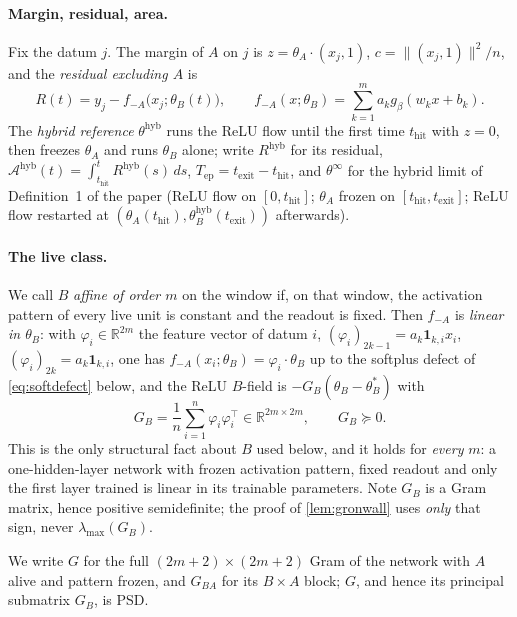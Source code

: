 \documentclass[11pt]{article}
\theoremstyle{definition}
\theoremstyle{remark}
\newcommand{\R}{\mathbb{R}}
\newcommand{\hyb}{\mathrm{hyb}}
\newcommand{\thit}{t_{\mathrm{hit}}}
\newcommand{\texit}{t_{\mathrm{exit}}}
\newcommand{\Ar}{\mathcal{A}}
\newcommand{\Tep}{T_{\mathrm{ep}}}
\begin{document}
\paragraph{Margin, residual, area.} Fix the datum $j$. The margin of $A$ on $j$
is $z=\theta_A\cdot(x_j,1)$, $c=\|(x_j,1)\|^2/n$, and the \emph{residual
excluding $A$} is
\begin{equation}\label{eq:residual}
R(t)=y_j-f_{-A}\bigl(x_j;\theta_B(t)\bigr),
\qquad
f_{-A}(x;\theta_B)=\sum_{k=1}^{m}a_k g_\beta(w_kx+b_k).
\end{equation}
The \emph{hybrid reference} $\theta^{\hyb}$ runs the ReLU flow until the first
time $\thit$ with $z=0$, then freezes $\theta_A$ and runs $\theta_B$ alone; write
$R^{\hyb}$ for its residual, $\Ar^{\hyb}(t)=\int_{\thit}^{t}R^{\hyb}(s)\,ds$,
$\Tep=\texit-\thit$, and $\theta^\infty$ for the hybrid limit of
Definition~1 of the paper (ReLU flow on $[0,\thit]$; $\theta_A$ frozen on
$[\thit,\texit]$; ReLU flow restarted at
$(\theta_A(\thit),\theta_B^{\hyb}(\texit))$ afterwards).

\paragraph{The live class.} We call $B$ \emph{affine of order $m$} on the window
if, on that window, the activation pattern of every live unit is constant and the
readout is fixed. Then $f_{-A}$ is \emph{linear in $\theta_B$}: with
$\varphi_i\in\R^{2m}$ the feature vector of datum $i$,
$(\varphi_i)_{2k-1}=a_k\mathbf 1_{k,i}x_i$, $(\varphi_i)_{2k}=a_k\mathbf
1_{k,i}$, one has $f_{-A}(x_i;\theta_B)=\varphi_i\cdot\theta_B$ up to the
softplus defect of \eqref{eq:softdefect} below, and the ReLU $B$-field is
$-G_B(\theta_B-\theta_B^\ast)$ with
\begin{equation}\label{eq:gram}
G_B=\frac1n\sum_{i=1}^n\varphi_i\varphi_i^{\!\top}\in\R^{2m\times2m},
\qquad G_B\succeq0 .
\end{equation}
This is the only structural fact about $B$ used below, and it holds for
\emph{every} $m$: a one-hidden-layer network with frozen activation pattern,
fixed readout and only the first layer trained is linear in its trainable
parameters. Note $G_B$ is a Gram matrix, hence positive semidefinite; the proof
of \cref{lem:gronwall} uses \emph{only} that sign, never $\lambda_{\max}(G_B)$.

We write $G$ for the full $(2m+2)\times(2m+2)$ Gram of the network with $A$ alive
and pattern frozen, and $G_{BA}$ for its $B\times A$ block; $G$, and hence its
principal submatrix $G_B$, is PSD.
\end{document}
